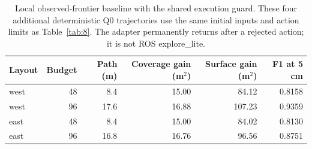 \begin{table}[!htbp]
\centering
\caption{Local observed-frontier baseline with the shared execution guard. These four additional deterministic Q0 trajectories use the same initial inputs and action limits as Table~\ref{tab:8}. The adapter permanently returns after a rejected action; it is not ROS explore\_lite.}\label{tab:9}
\small\setlength{\tabcolsep}{5pt}
\begin{tabular}{@{}lrrrrr@{}}
\toprule
Layout & Budget & Path (m) & Coverage gain (m$^2$) & Surface gain (m$^2$) & F1 at 5 cm\\
\midrule
west & 48 & 8.4 & 15.00 & 84.12 & 0.8158 \\
west & 96 & 17.6 & 16.88 & 107.23 & 0.9359 \\
east & 48 & 8.4 & 15.00 & 84.02 & 0.8130 \\
east & 96 & 16.8 & 16.76 & 96.56 & 0.8751 \\
\bottomrule
\end{tabular}
\end{table}
